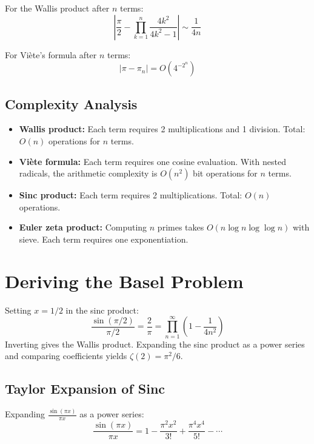\begin{theorem}
For the Wallis product after $n$ terms:
\[
\left|\frac{\pi}{2} - \prod_{k=1}^{n} \frac{4k^2}{4k^2-1}\right| \sim \frac{1}{4n}
\]
\end{theorem}

\begin{theorem}
For Vi\`{e}te's formula after $n$ terms:
\[
\left|\pi - \pi_n\right| = O(4^{-2^n})
\]
\end{theorem}

\subsection{Complexity Analysis}

\begin{itemize}
\item \textbf{Wallis product:} Each term requires 2 multiplications and 1 division. Total: $O(n)$ operations for $n$ terms.
\item \textbf{Vi\`{e}te formula:} Each term requires one cosine evaluation. With nested radicals, the arithmetic complexity is $O(n^2)$ bit operations for $n$ terms.
\item \textbf{Sinc product:} Each term requires 2 multiplications. Total: $O(n)$ operations.
\item \textbf{Euler zeta product:} Computing $n$ primes takes $O(n \log n \log\log n)$ with sieve. Each term requires one exponentiation.
\end{itemize}

\section{Deriving the Basel Problem}

Setting $x = 1/2$ in the sinc product:
\[
\frac{\sin(\pi/2)}{\pi/2} = \frac{2}{\pi} = \prod_{n=1}^\infty \left(1 - \frac{1}{4n^2}\right)
\]
Inverting gives the Wallis product. Expanding the sinc product as a power series and
comparing coefficients yields $\zeta(2) = \pi^2/6$.

\subsection{Taylor Expansion of Sinc}

\begin{theorem}
Expanding $\frac{\sin(\pi x)}{\pi x}$ as a power series:
\[
\frac{\sin(\pi x)}{\pi x} = 1 - \frac{\pi^2 x^2}{3!} + \frac{\pi^4 x^4}{5!} - \cdots
\]
\end{theorem}

